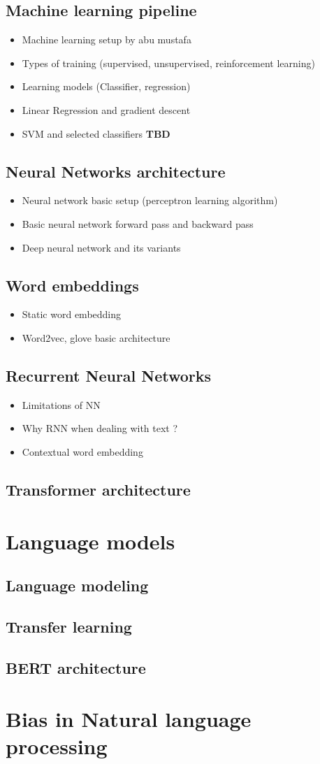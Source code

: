 \subsection{Machine learning pipeline}
    \begin{itemize}
        \item Machine learning setup by abu mustafa 
        \item Types of training (supervised, unsupervised, reinforcement learning)
        \item Learning models (Classifier, regression)
        \item Linear Regression and gradient descent 
        \item SVM and selected classifiers \textbf{TBD}
    \end{itemize}
\subsection{Neural Networks architecture}
    \begin{itemize}
        \item Neural network basic setup (perceptron learning algorithm)
        \item Basic neural network forward pass and backward pass
        \item  Deep neural network and its variants
    \end{itemize}
\subsection{Word embeddings}
    \begin{itemize}
        \item Static word embedding
        \item Word2vec, glove basic architecture
    \end{itemize}
\subsection{Recurrent Neural Networks}
    \begin{itemize}
        \item Limitations of NN 
        \item Why RNN when dealing with text ?
        \item Contextual word embedding
    \end{itemize}
\subsection{Transformer architecture}
\section{Language models}
\subsection{Language modeling}
\subsection{Transfer learning}
\subsection{BERT architecture}
\section{Bias in Natural language processing}